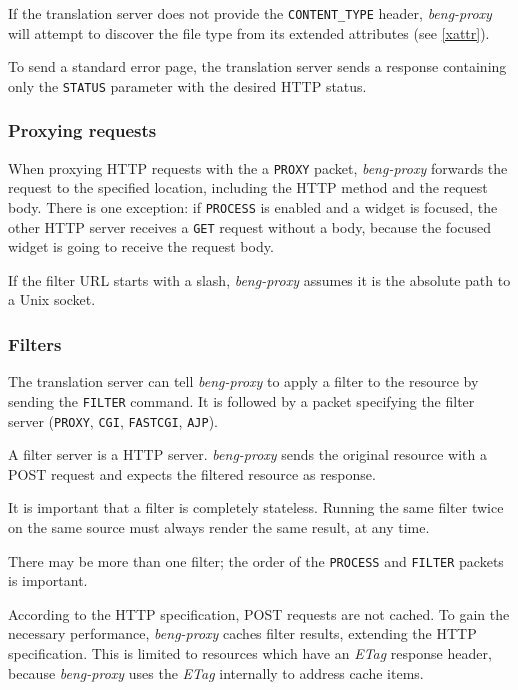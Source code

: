 \documentclass[a4paper,12pt]{article}
\begin{document}
If the translation server does not provide the \texttt{CONTENT\_TYPE}
header, \emph{beng-proxy} will attempt to discover the file type from
its extended attributes (see \ref{xattr}).

To send a standard error page, the translation server sends a response
containing only the \texttt{STATUS} parameter with the desired HTTP
status.

\subsubsection{Proxying requests}

When proxying HTTP requests with the a \texttt{PROXY} packet,
\emph{beng-proxy} forwards the request to the specified location,
including the HTTP method and the request body.  There is one
exception: if \texttt{PROCESS} is enabled and a widget is focused, the
other HTTP server receives a \texttt{GET} request without a body,
because the focused widget is going to receive the request body.

If the filter URL starts with a slash, \emph{beng-proxy} assumes it is
the absolute path to a Unix socket.

\subsubsection{Filters}
\label{filter}

The translation server can tell \emph{beng-proxy} to apply a filter to
the resource by sending the \texttt{FILTER} command.  It is followed
by a packet specifying the filter server (\texttt{PROXY},
\texttt{CGI}, \texttt{FASTCGI}, \texttt{AJP}).

A filter server is a HTTP server.  \emph{beng-proxy} sends the
original resource with a POST request and expects the filtered
resource as response.

It is important that a filter is completely stateless.  Running the
same filter twice on the same source must always render the same
result, at any time.

There may be more than one filter; the order of the \texttt{PROCESS}
and \texttt{FILTER} packets is important.

According to the HTTP specification, POST requests are not cached.  To
gain the necessary performance, \emph{beng-proxy} caches filter
results, extending the HTTP specification.  This is limited to
resources which have an \emph{ETag} response header, because
\emph{beng-proxy} uses the \emph{ETag} internally to address cache
items.
\end{document}
